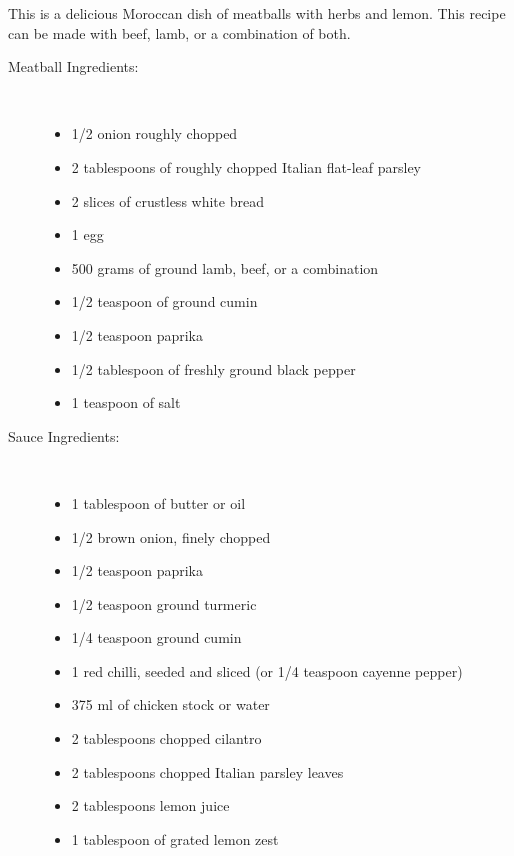 \documentclass[11pt,letterpaper]{article}
\begin{document}


This is a delicious Moroccan dish of meatballs with herbs and lemon. This recipe can be made with beef, lamb, or a combination of both.

\begin{description}

\item[Meatball Ingredients:]\ \\
	\begin{itemize}
	\item 1/2 onion roughly chopped
	\item 2 tablespoons of roughly chopped Italian flat-leaf parsley
	\item 2 slices of crustless white bread
	\item 1 egg
	\item 500 grams of ground lamb, beef, or a combination
	\item 1/2 teaspoon of ground cumin
	\item 1/2 teaspoon paprika
	\item 1/2 tablespoon of freshly ground black pepper
	\item 1 teaspoon of salt
	\end{itemize}
\item[Sauce Ingredients:]\ \\
	\begin{itemize}
	\item 1 tablespoon of butter or oil
	\item 1/2 brown onion, finely chopped
	\item 1/2 teaspoon paprika
	\item 1/2 teaspoon ground turmeric
	\item 1/4 teaspoon ground cumin
	\item 1 red chilli, seeded and sliced (or 1/4 teaspoon cayenne pepper)
	\item 375 ml of chicken stock or water
	\item 2 tablespoons chopped cilantro
	\item 2 tablespoons chopped Italian parsley leaves
	\item 2 tablespoons lemon juice
	\item 1 tablespoon of grated lemon zest
	\end{itemize}


\end{description}
\end{document}

